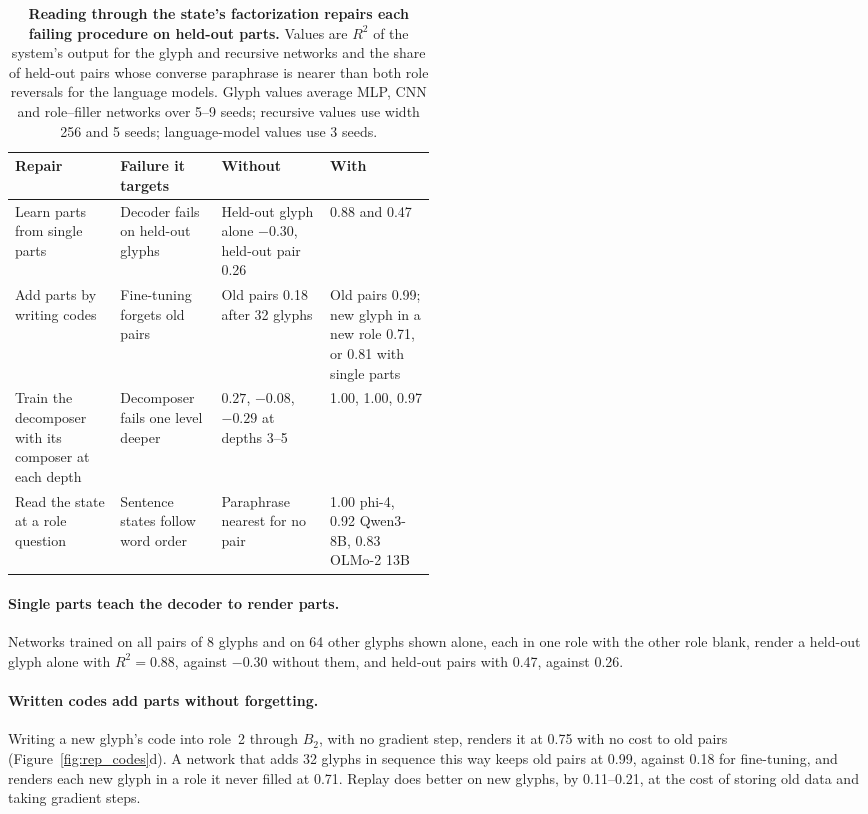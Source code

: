 \documentclass[10pt]{article}
\theoremstyle{plain}
\theoremstyle{remark}
\begin{document}
\begin{table}[t]
  \caption{\textbf{Reading through the state's factorization repairs each failing procedure on held-out parts.} Values are $R^2$ of the system's output for the glyph and recursive networks and the share of held-out pairs whose converse paraphrase is nearer than both role reversals for the language models. Glyph values average MLP, CNN and role--filler networks over 5--9 seeds; recursive values use width 256 and 5 seeds; language-model values use 3 seeds.}
  \label{tab:remedies}
  \centering\small
  \begin{tabularx}{\linewidth}{@{}P{0.25\linewidth}P{0.24\linewidth}YY@{}}
    \toprule
    Repair & Failure it targets & Without & With \\
    \midrule
    Learn parts from single parts & Decoder fails on held-out glyphs & Held-out glyph alone $-0.30$, held-out pair 0.26 & 0.88 and 0.47 \\
    Add parts by writing codes & Fine-tuning forgets old pairs & Old pairs 0.18 after 32 glyphs & Old pairs 0.99; new glyph in a new role 0.71, or 0.81 with single parts \\
    Train the decomposer with its composer at each depth & Decomposer fails one level deeper & $0.27$, $-0.08$, $-0.29$ at depths 3--5 & 1.00, 1.00, 0.97 \\
    Read the state at a role question & Sentence states follow word order & Paraphrase nearest for no pair & 1.00 phi-4, 0.92 Qwen3-8B, 0.83 OLMo-2 13B \\
    \bottomrule
  \end{tabularx}
\end{table}

\paragraph{Single parts teach the decoder to render parts.} Networks trained on all pairs of 8 glyphs and on 64 other glyphs shown alone, each in one role with the other role blank, render a held-out glyph alone with $R^2 = 0.88$, against $-0.30$ without them, and held-out pairs with 0.47, against 0.26.

\paragraph{Written codes add parts without forgetting.} Writing a new glyph's code into role~2 through $B_2$, with no gradient step, renders it at 0.75 with no cost to old pairs (Figure~\ref{fig:rep_codes}d). A network that adds 32 glyphs in sequence this way keeps old pairs at 0.99, against 0.18 for fine-tuning, and renders each new glyph in a role it never filled at 0.71. Replay does better on new glyphs, by 0.11--0.21, at the cost of storing old data and taking gradient steps.
\end{document}
